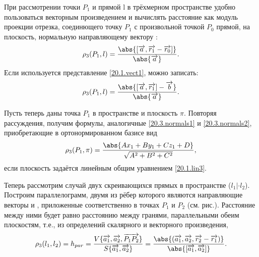   При рассмотрении точки $P_1$ и прямой l в трёхмерном пространстве удобно пользоваться векторным произведением и вычислять расстояние как модуль проекции отрезка, соединющего точку $P_1$ с произвольной точкой $P_0$ прямой, на плоскость, нормальную направляющему вектору :
  \begin{equation}
  \rho_3 (P_1,l) = \dfrac{\abs{[\overrightarrow{a},\overrightarrow{r_1}-\overrightarrow{r_0}]}}{\abs{\overrightarrow{a}}}.
  \end{equation}
  Если используется представление \ref{20.1.vect1}, можно записать:
  \begin{equation}
  \rho_3 (P_1,l) = \dfrac{\abs{[\overrightarrow{a},\overrightarrow{r_1}]-\overrightarrow{b}}}{\abs{\overrightarrow{a}}}.
  \end{equation}

  Пусть теперь даны точка $P_1$ в пространстве и плоскость $\pi$. Повторяя рассуждения, получим формулы, аналогичные \ref{20.3.normals1} и \ref{20.3.normals2}, приобретающие в ортонормированном базисе вид
  \begin{equation}
  \rho_3 (P_1,\pi) = \dfrac{\abs{Ax_1+By_1+Cz_1+D}}{\sqrt{A^2+B^2+C^2}},
  \end{equation}
  если плоскость задаётся линейным общим уравнением \ref{20.1.lin3}.

  Теперь рассмотрим случай двух скреивающихся прямых в пространстве ($l_1|\cdot l_2$). Построим параллелограмм, двумя из рёбер которого являются направляющие векторы  и , приложенные соответственно в точках $P_1$ и $P_2$ (см. рис.). Расстояние между ними будет равно расстоянию между гранями, параллельными обеим плоскостям, т.е., из определений скалярного и векторного произведения,
  \begin{equation}
  \rho_3(l_1,l_2)=h_{par}=\dfrac{V \lbrace \overrightarrow{a_1},\overrightarrow{a_2},\overrightarrow{P_1P_2} \rbrace}{S \lbrace \overrightarrow{a_1},\overrightarrow{a_2} \rbrace}=\dfrac{\abs{(\overrightarrow{a_1},\overrightarrow{a_2},\overrightarrow{r_2}-\overrightarrow{r_1})}}{\abs{[\overrightarrow{a_1},\overrightarrow{a_2}]}}.
  \end{equation}   
\label{ch20pict3}